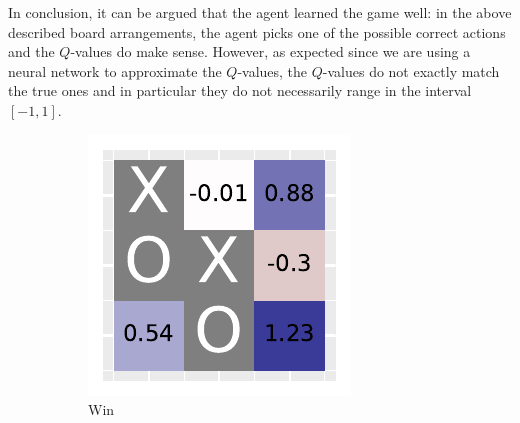 \documentclass[10pt]{IEEEtran}
\begin{document}
In conclusion, it can be argued that the agent learned the game well: in the above described board arrangements, the agent picks one of the possible correct actions and the $Q$-values do make sense. However, as expected since we are using a neural network to approximate the $Q$-values, the $Q$-values do not exactly match the true ones and in particular they do not necessarily range in the interval $[-1,1]$.

\begin{figure}[h]
     \centering
     \begin{subfigure}[t]{0.32\linewidth}
         \centering
         \includegraphics[width=\linewidth]{code/figures/deep_heatmap_0.pdf}
         \caption{Win}
         \label{fig_deep_heatmap_1}
     \end{subfigure}
     \hfill
     \begin{subfigure}[t]{0.32\linewidth}
         \centering

\end{subfigure}
\end{figure}
\end{document}
